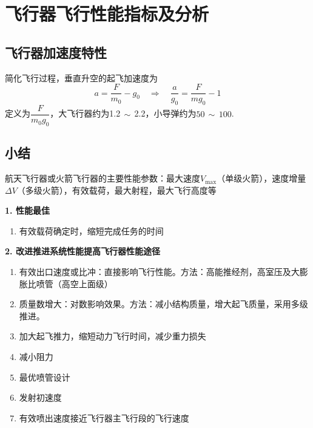 
\section{飞行器飞行性能指标及分析}

\subsection{飞行器加速度特性}
简化飞行过程，垂直升空的起飞加速度为
\begin{equation}
	a = \dfrac{F}{m_0} - g_0 \quad \Rightarrow \quad \dfrac{a}{g_0} = \dfrac{F}{mg_0} - 1
\end{equation}
定义为$\dfrac{F}{m_0g_0}$，大飞行器约为1.2$\, \sim \,$2.2，小导弹约为$50 \, \sim \, 100$.

\subsection{小结}
航天飞行器或火箭飞行器的主要性能参数：最大速度$V_{\max}$（单级火箭），速度增量$\Delta V$（多级火箭），有效载荷，最大射程，最大飞行高度等
\vspace*{0.5em}

\noindent \textbf{1. 性能最佳}
\begin{enumerate}[\hspace*{1.5em} (1)  ]
	\vspace*{-0.5em}
	\item 有效载荷确定时，缩短完成任务的时间\vspace*{-0.5em}
\end{enumerate}

\vspace*{0.5em}
\noindent \textbf{2. 改进推进系统性能提高飞行器性能途径}
\begin{enumerate}[\hspace*{1.5em} (1)  ]
	\vspace*{-0.5em}
	\item 有效出口速度或比冲：直接影响飞行性能。方法：高能推经剂，高室压及大膨胀比喷管（高空上面级）\vspace*{-0.5em}
	\item 质量数增大：对数影响效果。方法：减小结构质量，增大起飞质量，采用多级推进。\vspace*{-0.5em}
	\item 加大起飞推力，缩短动力飞行时间，减少重力损失\vspace*{-0.5em}
	\item 减小阻力\vspace*{-0.5em}
	\item 最优喷管设计\vspace*{-0.5em}
	\item 发射初速度\vspace*{-0.5em}
	\item 有效喷出速度接近飞行器主飞行段的飞行速度
\end{enumerate}

